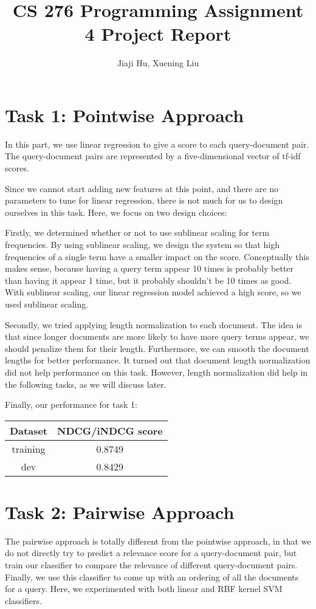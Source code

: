 \documentclass[10pt,twocolumn]{article}
\begin{document}
\title{CS 276 Programming Assignment 4 Project Report}
\author{Jiaji Hu, Xuening Liu}
\date{}
\maketitle

\section*{Task 1: Pointwise Approach}
In this part, we use linear regression to give a score to each query-document pair. The query-document pairs are represented by a five-dimensional vector of tf-idf scores.

Since we cannot start adding new features at this point, and there are no parameters to tune for linear regression, there is not much for us to design ourselves in this task. Here, we focus on two design choices:

Firstly, we determined whether or not to use sublinear scaling for term frequencies. By using sublinear scaling, we design the system so that high frequencies of a single term have a smaller impact on the score. Conceptually this makes sense, because having a query term appear 10 times is probably better than having it appear 1 time, but it probably shouldn't be 10 times as good. With sublinear scaling, our linear regression model achieved a high score, so we used sublinear scaling.

Secondly, we tried applying length normalization to each document. The idea is that since longer documents are more likely to have more query terms appear, we should penalize them for their length. Furthermore, we can smooth the document lengths for better performance. It turned out that document length normalization did not help performance on this task. However, length normalization did help in the following tasks, as we will discuss later.

Finally, our performance for task 1:
\begin{table}[H]
\centering
\begin{tabular}{|c|c|}
\hline
Dataset & NDCG/iNDCG score \\\hline
training & 0.8749\\\hline
dev & 0.8429\\\hline
\end{tabular}
\end{table}

\section*{Task 2: Pairwise Approach}
The pairwise approach is totally different from the pointwise approach, in that we do not directly try to predict a relevance score for a query-document pair, but train our classifier to compare the relevance of different query-document pairs. Finally, we use this classifier to come up with an ordering of all the documents for a query. Here, we experimented with both linear and RBF kernel SVM classifiers.
\end{document}
